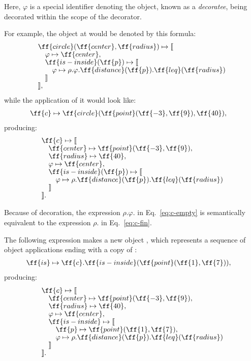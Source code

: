 Here, $\varphi$ is a special identifier denoting the object,
known as a \emph{decoratee}, being decorated
within the scope of the decorator.

For example, the object at  would
be denoted by this formula:
\begin{equation}\label{eq:c-empty}
\begin{split}
& \ff{circle}(\ff{center}, \ff{radius}) \mapsto \llbracket \br
& \quad \varphi \mapsto \ff{center}, \br
& \quad \ff{is-inside}(\ff{p}) \mapsto \llbracket \br
& \quad \quad \varphi \mapsto \rho.\varphi.\ff{distance}(\ff{p}).\ff{leq}(\ff{radius}) \br
& \quad \rrbracket \br
& \rrbracket,
\end{split}
\end{equation}
while the application of it would look like:
\begin{equation}
\begin{split}
\ff{c} & \mapsto \ff{circle}(\ff{point}(\ff{-3}, \ff{9}), \ff{40}),
\end{split}
\end{equation}
producing:
\begin{equation}\label{eq:c-fin}
\begin{split}
& \ff{c} \mapsto \llbracket \br
& \quad \ff{center} \mapsto \ff{point}(\ff{-3}, \ff{9}), \br
& \quad \ff{radius} \mapsto \ff{40}, \br
& \quad \varphi \mapsto \ff{center}, \br
& \quad \ff{is-inside}(\ff{p}) \mapsto \llbracket \br
& \quad \quad \varphi \mapsto \rho.\ff{distance}(\ff{p}).\ff{leq}(\ff{radius}) \br
& \quad \rrbracket \br
& \rrbracket.
\end{split}
\end{equation}

Because of decoration, the expression
$\rho$.$\varphi$. in Eq.~\ref{eq:c-empty} is semantically equivalent to the expression
$\rho$. in Eq.~\ref{eq:c-fin}.

The following expression makes a new object , which represents
a sequence of object applications ending with a copy of :
\begin{equation}\label{eq:is}
\begin{split}
& \ff{is} \mapsto \ff{c}.\ff{is-inside}(\ff{point}(\ff{1}, \ff{7})),
\end{split}
\end{equation}
producing:
\begin{equation}\label{eq:c-fin2}
\begin{split}
& \ff{c} \mapsto \llbracket \br
& \quad \ff{center} \mapsto \ff{point}(\ff{-3}, \ff{9}), \br
& \quad \ff{radius} \mapsto \ff{40}, \br
& \quad \varphi \mapsto \ff{center}, \br
& \quad \ff{is-inside} \mapsto \llbracket \br
& \quad \quad \ff{p} \mapsto \ff{point}(\ff{1}, \ff{7}), \br
& \quad \quad \varphi \mapsto \rho.\ff{distance}(\ff{p}).\ff{leq}(\ff{radius}) \br
& \quad \rrbracket \br
& \rrbracket.
\end{split}
\end{equation}


